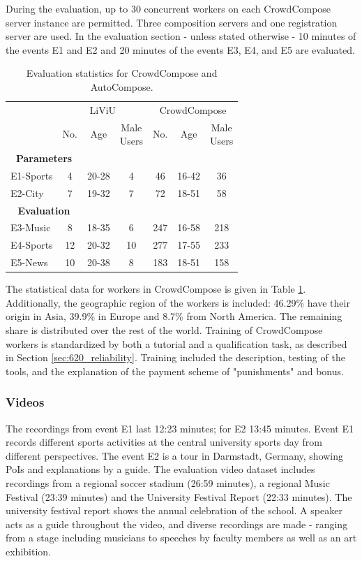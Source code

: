 During the evaluation, up to 30 concurrent workers on each CrowdCompose server instance are permitted. 
Three composition servers and one registration server are used.
In the evaluation section - unless stated otherwise - 10 minutes of the events E1 and E2 and 20 minutes of the events E3, E4, and E5 are evaluated. 
\begin{table}
	\centering 
	\caption{Evaluation statistics for CrowdCompose and AutoCompose.}
	\begin{tabular}{lcccccc}
		\toprule
		&\multicolumn{3}{c}{LiViU}  &\multicolumn{3}{c}{CrowdCompose} \\
		&No. & Age & \specialcell{Male\\Users}  & No.& Age  & \specialcell{Male\\Users}  \\ 
		\hline 
		\multicolumn{2}{c}{\textbf{Parameters}}\\
		E1-Sports & 4 & 20-28 & 4 & 46 & 16-42& 36\\
		E2-City& 7 & 19-32 & 7 & 72 & 18-51 & 58 \\
		\hline
		\multicolumn{2}{c}{\textbf{Evaluation}}\\
		E3-Music & 8 & 18-35 & 6 & 247 & 16-58 & 218 \\ 
		E4-Sports& 12 & 20-32 & 10 & 277 & 17-55 & 233   \\
		E5-News & 10  & 20-38 & 8 & 183 & 18-51 & 158  \\ 
		\bottomrule
	\end{tabular} 
	\label{tab:690_demographics}
\end{table}
The statistical data for workers in CrowdCompose is given in Table \ref{tab:690_demographics}. 
Additionally, the geographic region of the workers is included: 46.29\% have their origin in Asia, 39.9\% in Europe and 8.7\% from North America. 
The remaining share is distributed over the rest of the world.
Training of CrowdCompose workers is standardized by both a tutorial and a qualification task, as described in Section \ref{sec:620_reliability}. 
Training included the description, testing of the tools, and the explanation of the payment scheme of "punishments" and bonus.

\subsubsection{Videos}
The recordings from event E1 last 12:23 minutes; for E2 13:45 minutes. 
Event E1 records different sports activities at the central university sports day from different perspectives. 
The event E2 is a tour in Darmstadt, Germany, showing \ac{PoI}s and explanations by a guide. 
The evaluation video dataset includes recordings from a regional soccer stadium (26:59 minutes), a regional Music Festival (23:39 minutes) and the University Festival Report (22:33 minutes). 
The university festival report shows the annual celebration of the school. 
A speaker acts as a guide throughout the video, and diverse recordings are made - ranging from a stage including musicians to speeches by faculty members as well as an art exhibition.
